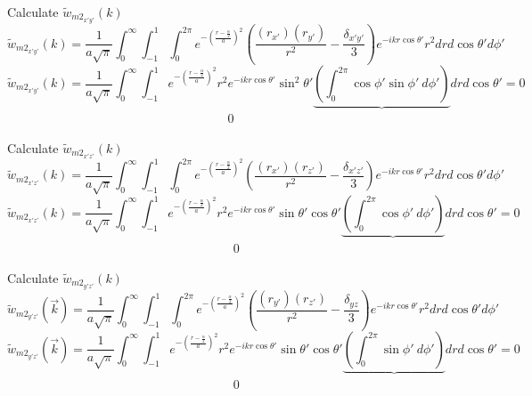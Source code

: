 \documentclass[double,12pt]{beavtex}
\begin{document}
Calculate $\widetilde{w}_{{m2}_{x'y'}}(k)$ 
\begin{equation}{\widetilde{w}_{{m2}_{x'y'}}(k)=\frac{1}{a\sqrt{\pi}}\int_{0}^{\infty}\int_{-1}^{1}\int_{0}^{2\pi}e^{-\left(\frac{r-\frac{\alpha}{2}}{a}\right)^2}\left(\frac{(r_{x'})(r_{y'})}{r^2}-\frac{\delta_{x'y'}}{3}\right)e^{-ikr\cos\theta'}r^2d{r}d{\cos\theta'}d{\phi'}}\end{equation}
\begin{equation}{\widetilde{w}_{{m2}_{x'y'}}(k)=\frac{1}{a\sqrt{\pi}}\int_{0}^{\infty}\int_{-1}^{1}e^{-\left(\frac{r-\frac{\alpha}{2}}{a}\right)^2}r^2e^{-ikr\cos\theta'}\sin^2\theta'\underbrace{\left(\int_{0}^{2\pi}\cos\phi'\sin{\phi'}~d{\phi'}\right)}d{r}d{\cos\theta'}=0}\end{equation}
$~~~~~~~~~~~~~~~~~~~~~~~~~~~~~~~~~~~~~~~~~~~~~~~~~~~~~~~~~~~~~~~~~~~~~~~~~~~~~~~~0$

Calculate $\widetilde{w}_{{m2}_{x'z'}}(k)$ 
\begin{equation}{\widetilde{w}_{{m2}_{x'z'}}(k)=\frac{1}{a\sqrt{\pi}}\int_{0}^{\infty}\int_{-1}^{1}\int_{0}^{2\pi}e^{-\left(\frac{r-\frac{\alpha}{2}}{a}\right)^2}\left(\frac{(r_{x'})(r_{z'})}{r^2}-\frac{\delta_{x'z'}}{3}\right)e^{-ikr\cos\theta'}r^2d{r}d{\cos\theta'}d{\phi'}}\end{equation}
\begin{equation}{\widetilde{w}_{{m2}_{x'z'}}(k)=\frac{1}{a\sqrt{\pi}}\int_{0}^{\infty}\int_{-1}^{1}e^{-\left(\frac{r-\frac{\alpha}{2}}{a}\right)^2}r^2e^{-ikr\cos\theta'}\sin\theta'\cos\theta'\underbrace{\left(\int_{0}^{2\pi}\cos\phi'~d{\phi'}\right)}d{r}d{\cos\theta'}=0}\end{equation}
$~~~~~~~~~~~~~~~~~~~~~~~~~~~~~~~~~~~~~~~~~~~~~~~~~~~~~~~~~~~~~~~~~~~~~~~~~~~~~~~~~~0$

Calculate $\widetilde{w}_{{m2}_{y'z'}}(k)$ 
\begin{equation}{\widetilde{w}_{{m2}_{y'z'}}(\vec{k})=\frac{1}{a\sqrt{\pi}}\int_{0}^{\infty}\int_{-1}^{1}\int_{0}^{2\pi}e^{-\left(\frac{r-\frac{\alpha}{2}}{a}\right)^2}\left(\frac{(r_{y'})(r_{z'})}{r^2}-\frac{\delta_{yz}}{3}\right)e^{-ikr\cos\theta'}r^2d{r}d{\cos\theta'}d{\phi'}}\end{equation}
\begin{equation}{\widetilde{w}_{{m2}_{y'z'}}(\vec{k})=\frac{1}{a\sqrt{\pi}}\int_{0}^{\infty}\int_{-1}^{1}e^{-\left(\frac{r-\frac{\alpha}{2}}{a}\right)^2}r^2e^{-ikr\cos\theta'}\sin\theta'\cos\theta'\underbrace{\left(\int_{0}^{2\pi}\sin\phi'~d{\phi'}\right)}d{r}d{\cos\theta'}=0}\end{equation}
$~~~~~~~~~~~~~~~~~~~~~~~~~~~~~~~~~~~~~~~~~~~~~~~~~~~~~~~~~~~~~~~~~~~~~~~~~~~~~~~~~~0$
\end{document}
